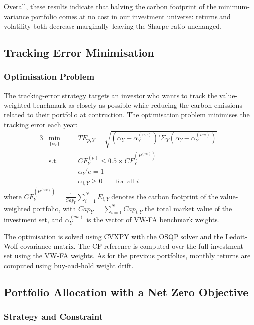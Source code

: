 \documentclass[11pt,a4paper]{article}
\begin{document}
Overall, these results indicate that halving the carbon footprint of the minimum-variance portfolio comes at no cost in our investment universe: returns and volatility both decrease marginally, leaving the Sharpe ratio unchanged.

\subsection{Tracking Error Minimisation}

\subsubsection{Optimisation Problem}

The tracking-error strategy targets an investor who wants to track the value-weighted benchmark as closely as possible while reducing the carbon emissions related to their portfolio at contruction. The optimisation problem minimises the tracking error each year:
\begin{alignat}{3}
&\min_{\{\alpha_Y\}} \quad & &TE_{p,Y} = \sqrt{(\alpha_Y - \alpha_Y^{(vw)})'\Sigma_Y(\alpha_Y - \alpha_Y^{(vw)})} \nonumber \\[10pt]
&\text{s.t.} \quad & &CF_Y^{(p)} \leq 0.5 \times CF_Y^{(P^{(vw)})} \\
& & &\alpha_Y' e = 1 \\
& & &\alpha_{i,Y} \geq 0 \qquad \text{for all } i
\end{alignat}
where $CF_Y^{(P^{(vw)})} = \frac{1}{Cap_Y} \sum_{i=1}^{N} E_{i,Y}$ denotes the carbon footprint of the value-weighted portfolio, with $Cap_Y = \sum_{i=1}^{N} Cap_{i,Y}$ the total market value of the investment set, and $\alpha_Y^{(vw)}$ is the vector of VW-FA benchmark weights.

The optimisation is solved using CVXPY with the OSQP solver and the Ledoit-Wolf covariance matrix. The CF reference is computed over the full investment set using the VW-FA weights. As for the previous portfolios, monthly returns are computed using buy-and-hold weight drift.


\subsection{Portfolio Allocation with a Net Zero Objective}
\label{sec:netzero}

\subsubsection{Strategy and Constraint}
\end{document}
